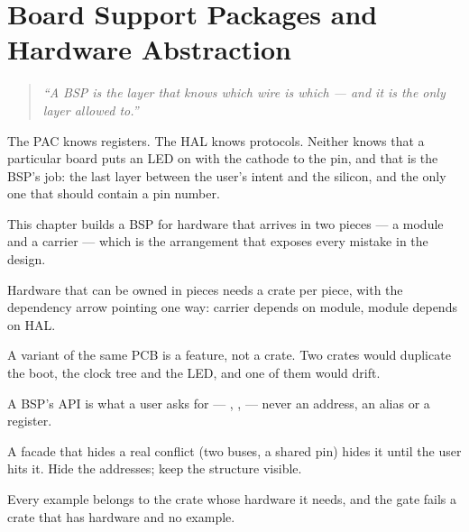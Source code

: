 
\chapter{Board Support Packages and Hardware Abstraction}
\label{ch:chapter-15}

\begin{quote}
    \textit{``A BSP is the layer that knows which wire is which — and it is the only layer allowed
    to.''}
\end{quote}

The PAC knows registers. The HAL knows protocols. Neither knows that a particular board puts an LED on
 with the cathode to the pin, and that is the BSP's job: the last layer between the
user's intent and the silicon, and the only one that should contain a pin number.

This chapter builds a BSP for hardware that arrives in two pieces — a module and a carrier — which is
the arrangement that exposes every mistake in the design.

\minitoc

\clearpage






\clearpage

\begin{keytakeaways}
    \item Hardware that can be owned in pieces needs a crate per piece, with the dependency arrow
          pointing one way: carrier depends on module, module depends on HAL.
    \item A variant of the same PCB is a feature, not a crate. Two crates would duplicate the boot,
          the clock tree and the LED, and one of them would drift.
    \item A BSP's API is what a user asks for — , ,
           — never an address, an alias or a register.
    \item A facade that hides a real conflict (two buses, a shared pin) hides it until the user hits
          it. Hide the addresses; keep the structure visible.
    \item Every example belongs to the crate whose hardware it needs, and the gate fails a crate that
          has hardware and no example.
\end{keytakeaways}
